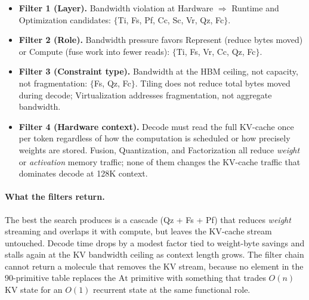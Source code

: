 \documentclass[10pt,twocolumn]{article}
\begin{document}
\begin{itemize}[nosep, leftmargin=*]
\item \textbf{Filter 1 (Layer).} Bandwidth violation at Hardware $\Rightarrow$ Runtime and Optimization candidates: $\{$Ti, Fs, Pf, Cc, Sc, Vr, Qz, Fc$\}$.
\item \textbf{Filter 2 (Role).} Bandwidth pressure favors Represent (reduce bytes moved) or Compute (fuse work into fewer reads): $\{$Ti, Fs, Vr, Cc, Qz, Fc$\}$.
\item \textbf{Filter 3 (Constraint type).} Bandwidth at the HBM ceiling, not capacity, not fragmentation: $\{$Fs, Qz, Fc$\}$. Tiling does not reduce total bytes moved during decode; Virtualization addresses fragmentation, not aggregate bandwidth.
\item \textbf{Filter 4 (Hardware context).} Decode must read the full KV-cache once per token regardless of how the computation is scheduled or how precisely weights are stored. Fusion, Quantization, and Factorization all reduce \emph{weight} or \emph{activation} memory traffic; none of them changes the KV-cache traffic that dominates decode at 128K context.
\end{itemize}

\paragraph{What the filters return.} The best the search produces is a cascade (Qz + Fs + Pf) that reduces \emph{weight} streaming and overlaps it with compute, but leaves the KV-cache stream untouched. Decode time drops by a modest factor tied to weight-byte savings and stalls again at the KV bandwidth ceiling as context length grows. The filter chain cannot return a molecule that removes the KV stream, because no element in the 90-primitive table replaces the $\text{At}$ primitive with something that trades $O(n)$ KV state for an $O(1)$ recurrent state at the same functional role.
\end{document}
